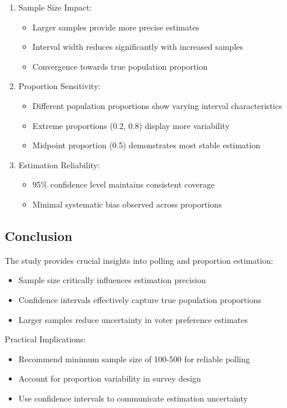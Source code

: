 \documentclass[12pt]{article}
\begin{document}
\begin{enumerate}
    \item Sample Size Impact:
    \begin{itemize}
        \item Larger samples provide more precise estimates
        \item Interval width reduces significantly with increased samples
        \item Convergence towards true population proportion
    \end{itemize}
    
    \item Proportion Sensitivity:
    \begin{itemize}
        \item Different population proportions show varying interval characteristics
        \item Extreme proportions (0.2, 0.8) display more variability
        \item Midpoint proportion (0.5) demonstrates most stable estimation
    \end{itemize}
    
    \item Estimation Reliability:
    \begin{itemize}
        \item 95\% confidence level maintains consistent coverage
        \item Minimal systematic bias observed across proportions
    \end{itemize}
\end{enumerate}

\subsection{Conclusion}
The study provides crucial insights into polling and proportion estimation:

\begin{itemize}
    \item Sample size critically influences estimation precision
    \item Confidence intervals effectively capture true population proportions
    \item Larger samples reduce uncertainty in voter preference estimates
\end{itemize}

Practical Implications:
\begin{itemize}
    \item Recommend minimum sample size of 100-500 for reliable polling
    \item Account for proportion variability in survey design
    \item Use confidence intervals to communicate estimation uncertainty
\end{itemize}
\end{document}

